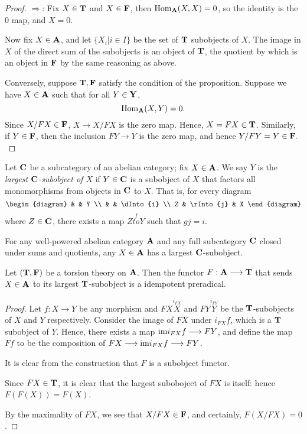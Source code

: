 \begin{proof}
\noindent $\Rightarrow$: Fix $X \in \mathbf{T}$ and $X \in \mathbf{F}$, 
then $\mathrm{Hom}_{\mathbf{A}}(X,X) = 0$, so the identity is the 0 map, and
$X = 0$.

Now fix $X \in \mathbf{A}$, and let $\{X_i | i \in I\}$ be the set
of $\mathbf{T}$ subobjects of $X$. The image in $X$ of the direct 
sum of the subobjects is an object of $\mathbf{T}$, the quotient by 
which is an object in $\mathbf{F}$ by the same reasoning as above.

Conversely, suppose $\mathbf{T}, \mathbf{F}$ satisfy the condition of 
the proposition. Suppose we have $X \in \mathbf{A}$ such that for all
$Y \in \mathbf{Y}$,
\[
\mathrm{Hom}_{\mathbf{A}}(X, Y) = 0.
\]
Since $X/FX \in \mathbf{F}$, $X \to X/FX$ is the zero map. Hence, $X 
= FX \in \mathbf{T}$. Similarly, if $Y \in \mathbf{F}$, then the 
inclusion $FY \to Y$ is the zero map, and hence $Y/FY = Y \in 
\mathbf{F}.$
\end{proof}

\begin{definition}
Let $\mathbf{C}$ be a subcategory of an abelian category; fix $X \in
\mathbf{A}$. We say $Y$ is the \emph{largest $\mathbf{C}$-subobject of 
$X$} if $Y \in \mathbf{C}$ is a subobject of $X$ that factors all 
monomorphisms from objects in $\mathbf{C}$ to $X$. That is, for 
every diagram
\[
\begin{diagram}
  &           & Y         \\
  &           & \dInto{i} \\
Z & \rInto{j} & X
\end{diagram}
\]
where $Z \in \mathbf{C}$, there exists a map $Z \stackrel{f}{to} Y$ 
such that $gj = i$.
\end{definition}

\begin{por}
For any well-powered abelian category $\mathbf{A}$ and any full 
subcategory $\mathbf{C}$ closed under sums and quotients, any $X \in 
\mathbf{A}$ has a largest $\mathbf{C}$-subobject.
\end{por}

\begin{prop}
Let $(\mathbf{T}, \mathbf{F})$ be a torsion theory on $\mathbf{A}$. Then
the functor $F: \mathbf{A} \longrightarrow \mathbf{T}$ that sends $X \in \mathbf{A}$
to its largest $\mathbf{T}$-subobject is a idempotent preradical.
\end{prop}

\begin{proof}
Let $f: X \to Y$ be any morphism and $FX \stackrel{i_{FX}}{X}$ 
and $FY\stackrel{i_{FY}}{Y}$ be the $\mathbf{T}$-subobjects of $X$ 
and $Y$ respectively. Consider the image of $FX$ under $i_{FX}f$, 
which is a $\mathbf{T}$ subobject of $Y$. Hence, there exists a map 
$\mathrm{im} i_{FX}f \longrightarrow FY$, and define the map $Ff$ to be the 
composition of $FX \longrightarrow \mathrm{im} i_{FX}f \longrightarrow FY$.

It is clear from the construction that $F$ is a subobject functor.

Since $FX \in \mathbf{T}$, it is clear that the largest suboboject
of $FX$ is itself: hence $F(F(X)) = F(X)$.

By the maximality of $FX$, we see that $X/FX \in \mathbf{F}$, and
certainly, $F(X/FX) = 0$.
\end{proof}

